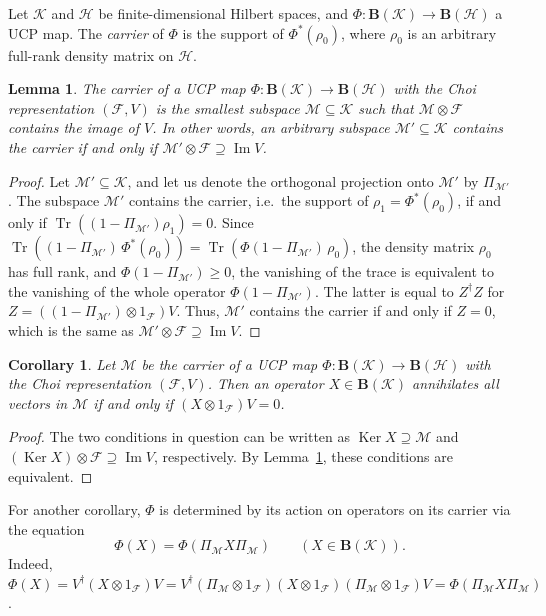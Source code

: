 \documentclass[12pt]{article}
\newcommand{\calF}{\mathcal{F}}
\newcommand{\calH}{\mathcal{H}}
\newcommand{\calK}{\mathcal{K}}
\newcommand{\calM}{\mathcal{M}}
\DeclareMathOperator{\Ker}{Ker}
\DeclareMathOperator{\Img}{Im}
\DeclareMathOperator{\Tr}{Tr}
\newcommand{\Bo}{\mathbf{B}}
\renewcommand{\ge}{\geqslant}
\newtheorem{Lemma}[Theorem]{Lemma}
\newtheorem{Corollary}[Theorem]{Corollary}
\newtheorem[definition]{Definition}[Theorem]{Definition}
\newtheorem[remark]{Example}[Theorem]{Example}
\newtheorem[remark]{Remark}[Theorem]{Remark}
\newtheorem[remark]{Question}[Theorem]{Open question}
\newtheorem*[definition]{definition}{Definition}
\newtheorem*[remark]{example}{Example}
\newtheorem*[remark]{remark}{Remark}
\newtheorem*[remark]{question}{Open question}
\numberwithin{equation}{section}
\begin{document}
Let $\calK$ and $\calH$ be finite-dimensional Hilbert spaces, and $\Phi\colon\Bo(\calK)\to\Bo(\calH)$ a UCP map. The \emph{carrier} of $\Phi$ is the support of $\Phi^*(\rho_0)$, where $\rho_0$ is an arbitrary full-rank density matrix on $\calH$.

\begin{Lemma}\label{lem_carrier}
The carrier of a UCP map $\Phi\colon\Bo(\calK)\to\Bo(\calH)$ with the Choi representation $(\calF,V)$ is the smallest subspace $\calM\subseteq\calK$ such that $\calM\otimes\calF$ contains the image of $V$. In other words, an arbitrary subspace $\calM'\subseteq\calK$ contains the carrier if and only if $\calM'\otimes\calF\supseteq\Img V$.
\end{Lemma}
\begin{proof}
Let $\calM'\subseteq\calK$, and let us denote the orthogonal projection onto $\calM'$ by $\Pi_{\calM'}$. The subspace $\calM'$ contains the carrier, i.e.\ the support of $\rho_1=\Phi^*(\rho_0)$, if and only if $\Tr((1-\Pi_{\calM'})\rho_1)=0$. Since $\Tr((1-\Pi_{\calM'})\,\Phi^*(\rho_0))=\Tr(\Phi(1-\Pi_{\calM'})\,\rho_0)$, the density matrix $\rho_0$ has full rank, and $\Phi(1-\Pi_{\calM'})\ge0$, the vanishing of the trace is equivalent to the vanishing of the whole operator $\Phi(1-\Pi_{\calM'})$. The latter is equal to $Z^\dag Z$ for $Z=((1-\Pi_{\calM'})\otimes 1_\calF)V$. Thus, $\calM'$ contains the carrier if and only if $Z=0$, which is the same as $\calM'\otimes\calF\supseteq\Img V$.
\end{proof}

\begin{Corollary}\label{cor_carrier}
Let $\calM$ be the carrier of a UCP map $\Phi\colon\Bo(\calK)\to\Bo(\calH)$ with the Choi representation $(\calF,V)$. Then an operator $X\in\Bo(\calK)$ annihilates all vectors in $\calM$ if and only if $(X\otimes 1_\calF)V=0$.
\end{Corollary}

\begin{proof}
The two conditions in question can be written as $\Ker X\supseteq\calM$ and $(\Ker X)\otimes\calF\supseteq\Img V$, respectively. By Lemma~\ref{lem_carrier}, these conditions are equivalent.
\end{proof}
For another corollary, $\Phi$ is determined by its action on operators on its carrier via the equation
\begin{equation}\label{PhiX_M}
\Phi(X)=\Phi(\Pi_{\calM}X\Pi_{\calM})\qquad (X\in\Bo(\calK)).
\end{equation}
Indeed, $\Phi(X)=V^\dag(X\otimes 1_\calF)V =V^\dag(\Pi_{\calM}\otimes 1_\calF)(X\otimes 1_\calF)(\Pi_{\calM}\otimes 1_\calF)V =\Phi(\Pi_{\calM}X\Pi_{\calM})$.
\end{document}
